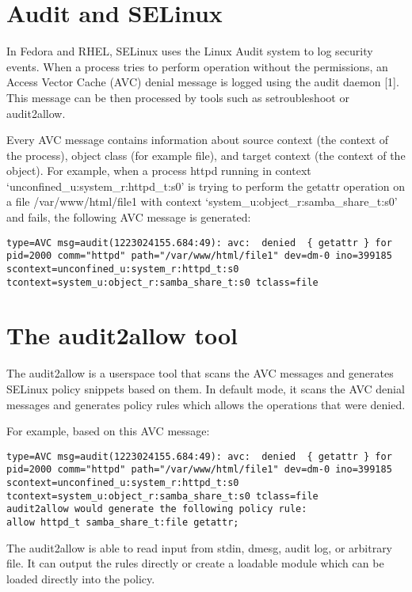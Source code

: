 \section{Audit and SELinux}
In Fedora and RHEL, SELinux uses the Linux Audit system to log security events. When a process tries to perform operation without the permissions, an Access Vector Cache (AVC) denial message is logged using the audit daemon [1]. This message can be then processed by tools such as setroubleshoot or audit2allow.

Every AVC message contains information about source context (the context of the
process), object class (for example file), and target context (the context of
the object). For example, when a process httpd running in context
‘unconfined\_u:system\_r:httpd\_t:s0’ is trying to perform the getattr operation
on a file /var/www/html/file1 with context ‘system\_u:object\_r:samba\_share\_t:s0’ and fails, the following AVC message is generated:

\begin{lstlisting}
type=AVC msg=audit(1223024155.684:49): avc:  denied  { getattr } for  pid=2000 comm="httpd" path="/var/www/html/file1" dev=dm-0 ino=399185 scontext=unconfined_u:system_r:httpd_t:s0 tcontext=system_u:object_r:samba_share_t:s0 tclass=file
\end{lstlisting}

\section{The audit2allow tool}
The audit2allow is a userspace tool that scans the AVC messages and generates SELinux policy snippets based on them. In default mode, it scans the AVC denial messages and generates policy rules which allows the operations that were denied.

For example, based on this AVC message:
\begin{lstlisting}
type=AVC msg=audit(1223024155.684:49): avc:  denied  { getattr } for  pid=2000 comm="httpd" path="/var/www/html/file1" dev=dm-0 ino=399185 scontext=unconfined_u:system_r:httpd_t:s0 tcontext=system_u:object_r:samba_share_t:s0 tclass=file
audit2allow would generate the following policy rule:
allow httpd_t samba_share_t:file getattr;
\end{lstlisting}

The audit2allow is able to read input from stdin, dmesg, audit log, or arbitrary file. It can output the rules directly or create a loadable module which can be loaded directly into the policy.

